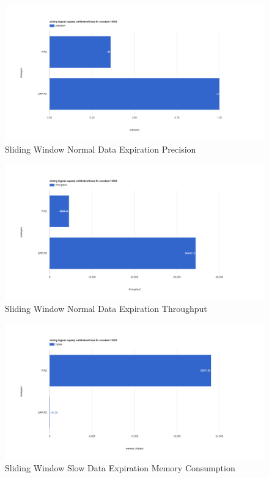 \begin{figure}[!htbp]
	\centering
    \includegraphics[width=6.5in]{img/app3-slide-normal-p.png}
    \caption{Sliding Window Normal Data Expiration Precision}
\end{figure}
\begin{figure}[!htbp]
	\centering
    \includegraphics[width=6.5in]{img/app3-slide-normal-t.png}
    \caption{Sliding Window Normal Data Expiration Throughput}
\end{figure}
\begin{figure}[!htbp]
	\centering
    \includegraphics[width=6.5in]{img/app3-slide-slow-m.png}
    \caption{Sliding Window Slow Data Expiration Memory Consumption}
\end{figure}
